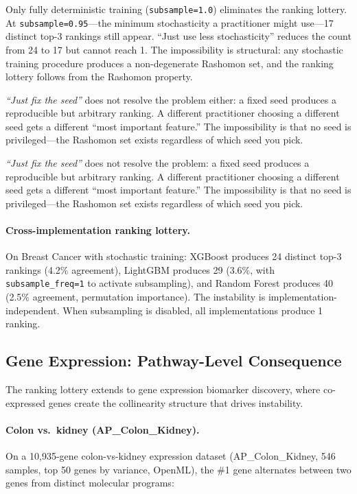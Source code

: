 \documentclass{article}
\begin{document}
Only fully deterministic training (\texttt{subsample=1.0}) eliminates the ranking lottery. At \texttt{subsample=0.95}---the minimum stochasticity a practitioner might use---17 distinct top-3 rankings still appear. ``Just use less stochasticity'' reduces the count from 24 to 17 but cannot reach 1. The impossibility is structural: any stochastic training procedure produces a non-degenerate Rashomon set, and the ranking lottery follows from the Rashomon property.

\emph{``Just fix the seed''} does not resolve the problem either: a fixed seed produces a reproducible but arbitrary ranking. A different practitioner choosing a different seed gets a different ``most important feature.'' The impossibility is that no seed is privileged---the Rashomon set exists regardless of which seed you pick.

\emph{``Just fix the seed''} does not resolve the problem: a fixed seed produces a reproducible but arbitrary ranking. A different practitioner choosing a different seed gets a different ``most important feature.'' The impossibility is that no seed is privileged---the Rashomon set exists regardless of which seed you pick.

\paragraph{Cross-implementation ranking lottery.}
On Breast Cancer with stochastic training: XGBoost produces 24 distinct top-3 rankings (4.2\% agreement), LightGBM produces 29 (3.6\%, with \texttt{subsample\_freq=1} to activate subsampling), and Random Forest produces 40 (2.5\% agreement, permutation importance). The instability is implementation-independent. When subsampling is disabled, all implementations produce 1 ranking.

\subsection{Gene Expression: Pathway-Level Consequence}
\label{sec:gene-expression}

The ranking lottery extends to gene expression biomarker discovery, where co-expressed genes create the collinearity structure that drives instability.

\paragraph{Colon vs.\ kidney (AP\_Colon\_Kidney).}
On a 10{,}935-gene colon-vs-kidney expression dataset (AP\_Colon\_Kidney, 546 samples, top 50 genes by variance, OpenML), the \#1 gene alternates between two genes from distinct molecular programs:
\end{document}
